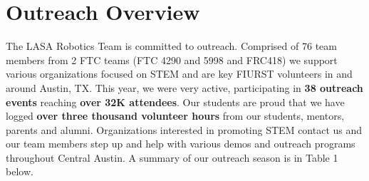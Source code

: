 \clearpage
\newpage

\section{Outreach Overview}
The LASA Robotics Team is committed to outreach.  Comprised of 76 team members from 2 FTC teams (FTC 4290 and 5998 and FRC418) we support various organizations focused on STEM and are key FIURST volunteers in and around Austin, TX.  This year, we were very active, participating in {\bf 38 outreach events} reaching {\bf over 32K attendees}.  Our students are proud that we have logged {\bf over three thousand volunteer hours} from our students, mentors, parents and alumni.   Organizations interested in promoting STEM contact us and our team members step up and help with various demos and outreach programs throughout Central Austin.  A summary of our outreach season is in Table 1 below. \\


